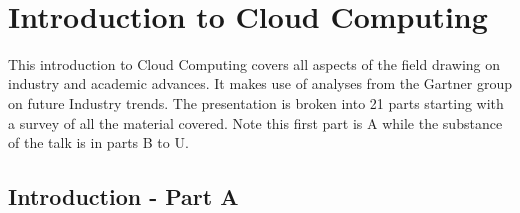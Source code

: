 
\FILENAME\

\section{Introduction to Cloud Computing}
\label{s:icloud-fundamentals}

This introduction to Cloud Computing covers all aspects of the field
drawing on industry and academic advances. It makes use of analyses
from the Gartner group on future Industry trends. The presentation is
broken into 21 parts starting with a survey of all the material
covered. Note this first part is A while the substance of the talk is
in parts B to U.


%


\subsection{Introduction - Part A}\label{s:cloud-fundamentals-a}

